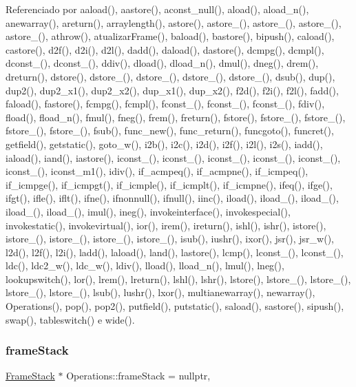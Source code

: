 Referenciado por aaload(), aastore(), aconst\+\_\+null(), aload(), aload\+\_\+n(), anewarray(), areturn(), arraylength(), astore(), astore\+\_(), astore\+\_(), astore\+\_(), astore\+\_(), athrow(), atualizar\+Frame(), baload(), bastore(), bipush(), caload(), castore(), d2f(), d2i(), d2l(), dadd(), daload(), dastore(), dcmpg(), dcmpl(), dconst\+\_(), dconst\+\_(), ddiv(), dload(), dload\+\_\+n(), dmul(), dneg(), drem(), dreturn(), dstore(), dstore\+\_(), dstore\+\_(), dstore\+\_(), dstore\+\_(), dsub(), dup(), dup2(), dup2\+\_\+x1(), dup2\+\_\+x2(), dup\+\_\+x1(), dup\+\_\+x2(), f2d(), f2i(), f2l(), fadd(), faload(), fastore(), fcmpg(), fcmpl(), fconst\+\_(), fconst\+\_(), fconst\+\_(), fdiv(), fload(), fload\+\_\+n(), fmul(), fneg(), frem(), freturn(), fstore(), fstore\+\_(), fstore\+\_(), fstore\+\_(), fstore\+\_(), fsub(), func\+\_\+new(), func\+\_\+return(), funcgoto(), funcret(), getfield(), getstatic(), goto\+\_\+w(), i2b(), i2c(), i2d(), i2f(), i2l(), i2s(), iadd(), iaload(), iand(), iastore(), iconst\+\_(), iconst\+\_(), iconst\+\_(), iconst\+\_(), iconst\+\_(), iconst\+\_(), iconst\+\_\+m1(), idiv(), if\+\_\+acmpeq(), if\+\_\+acmpne(), if\+\_\+icmpeq(), if\+\_\+icmpge(), if\+\_\+icmpgt(), if\+\_\+icmple(), if\+\_\+icmplt(), if\+\_\+icmpne(), ifeq(), ifge(), ifgt(), ifle(), iflt(), ifne(), ifnonnull(), ifnull(), iinc(), iload(), iload\+\_(), iload\+\_(), iload\+\_(), iload\+\_(), imul(), ineg(), invokeinterface(), invokespecial(), invokestatic(), invokevirtual(), ior(), irem(), ireturn(), ishl(), ishr(), istore(), istore\+\_(), istore\+\_(), istore\+\_(), istore\+\_(), isub(), iushr(), ixor(), jsr(), jsr\+\_\+w(), l2d(), l2f(), l2i(), ladd(), laload(), land(), lastore(), lcmp(), lconst\+\_(), lconst\+\_(), ldc(), ldc2\+\_\+w(), ldc\+\_\+w(), ldiv(), lload(), lload\+\_\+n(), lmul(), lneg(), lookupswitch(), lor(), lrem(), lreturn(), lshl(), lshr(), lstore(), lstore\+\_(), lstore\+\_(), lstore\+\_(), lstore\+\_(), lsub(), lushr(), lxor(), multianewarray(), newarray(), Operations(), pop(), pop2(), putfield(), putstatic(), saload(), sastore(), sipush(), swap(), tableswitch() e wide().

\mbox{\label{classOperations_a72ff498d126bb8082b3ac70ccb6e953a}} 
\subsubsection{\texorpdfstring{frame\+Stack}{frameStack}}
{\footnotesize\ttfamily \hyperlink{classFrameStack}{Frame\+Stack} $\ast$ Operations\+::frame\+Stack = nullptr\hspace{0.3cm}{\ttfamily [static]}, {\ttfamily [private]}}



